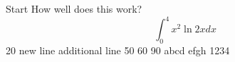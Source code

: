 \documentclass{article}
\begin{document}
Start
How well does this work?
$$\int_0^4 x^2 \ln{2x}dx$$
20
new line
additional line
50
60
90
abcd
efgh
1234
\end{document}
